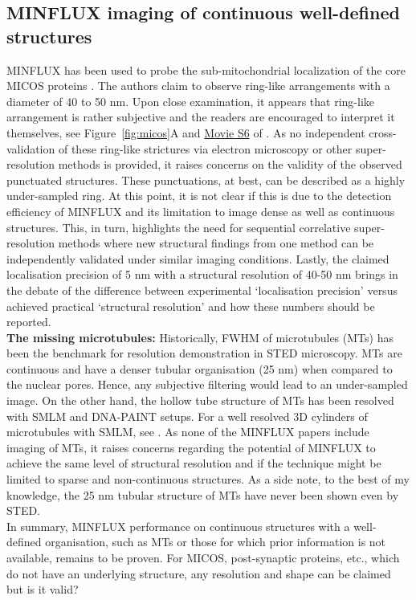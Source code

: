 \documentclass[9pt,twocolumn,twoside]{pnas-new}
\begin{document}
\subsection{MINFLUX imaging of continuous well-defined structures}

MINFLUX has been used to probe the sub-mitochondrial localization of the core MICOS proteins \citep{pape2020multicolor}. The authors claim to observe ring-like arrangements with a diameter of 40 to 50 nm. Upon close examination, it appears that ring-like arrangement is rather subjective and the readers are encouraged to interpret it themselves, see Figure~\ref{fig:micos}A and \href{http://movie-usa.glencoesoftware.com/video/10.1073/pnas.2009364117/video-6}{Movie S6} of \cite{pape2020multicolor}. As no independent cross-validation of these ring-like strictures via electron microscopy or other super-resolution methods is provided, it raises concerns on the validity of the observed punctuated structures. These punctuations, at best, can be described as a highly under-sampled ring. At this point, it is not clear if this is due to the detection efficiency of MINFLUX and its limitation to image dense as well as continuous structures. This, in turn, highlights the need for sequential correlative super-resolution methods where new structural findings from one method can be independently validated under similar imaging conditions. Lastly, the claimed localisation precision of 5 nm with a structural resolution of 40-50 nm brings in the debate of the difference between experimental `localisation precision' versus achieved practical `structural resolution' and how these numbers should be reported. \\
\noindent
\textbf{The missing microtubules:}
Historically, FWHM of microtubules (MTs) has been the benchmark for resolution demonstration in STED microscopy. MTs are continuous and have a denser tubular organisation (25 nm) when compared to the nuclear pores. Hence, any subjective filtering would lead to an under-sampled image. 
On the other hand, the hollow tube structure of MTs has been resolved with SMLM and DNA-PAINT setups. For a well resolved 3D cylinders of microtubules with SMLM, see \cite{huang2016ultra,li2018real}. As none of the MINFLUX papers include imaging of MTs, it raises concerns regarding the potential of MINFLUX to achieve the same level of structural resolution and if the technique might be limited to sparse and non-continuous structures. As a side note, to the best of my knowledge, the 25 nm tubular structure of MTs have never been shown even by STED.\\
In summary, MINFLUX performance on continuous structures with a well-defined organisation, such as MTs or those for which prior information is not available, remains to be proven. 
For MICOS, post-synaptic proteins, etc., which do not have an underlying structure, any resolution and shape can be claimed but is it valid?
\end{document}
